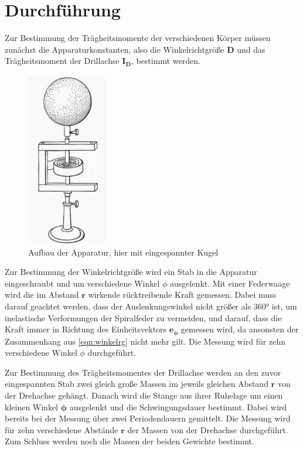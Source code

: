 \section{Durchführung}
\label{sec:Durchführung}

Zur Bestimmung der Trägheitsmomente der verschiedenen Körper müssen zunächst die
Apparaturkonstanten, also die Winkelrichtgröße $\symbf{D}$ und das Trägheitsmoment
der Drillachse $\symbf{I_D}$, bestimmt werden.
\begin{figure}
  \centering
  \includegraphics[width=100pt]{Aufbau.png}
  \caption{Aufbau der Apparatur, hier mit eingespannter Kugel \cite{Versuchsanleitung}}
  \label{fig:Aufbau}
\end{figure}


Zur Bestimmung der Winkelrichtgröße wird ein Stab in die Apparatur eingeschraubt und
um verschiedene Winkel $\phi$ ausgelenkt. Mit einer Federwaage wird die im Abstand
$\symbf{r}$ wirkende rücktreibende Kraft gemessen. Dabei muss darauf geachtet werden,
dass der Auslenkungswinkel nicht größer als 360° ist, um inelastische Verformungen der
Spiralfeder zu vermeiden, und darauf, dass die Kraft immer in Richtung des Einheitsvektors
$\symbf{e_{\phi}}$ gemessen wird, da ansonsten der Zusammenhang aus \eqref{eqn:winkelrg}
nicht mehr gilt. Die Messung wird für zehn verschiedene Winkel $\phi$ durchgeführt.

Zur Bestimmung des Trägheitsmomentes der Drillachse werden an den zuvor eingespannten
Stab zwei gleich große Massen im jeweils gleichen Abstand $\symbf{r}$ von der
Drehachse gehängt. Danach wird die Stange aus ihrer Ruhelage um einen kleinen Winkel
$\symbf{\phi}$ ausgelenkt und die Schwingungsdauer bestimmt. Dabei wird bereits bei
der Messung über zwei Periodendauern gemittelt. Die Messung wird für zehn verschiedene
Abstände $\symbf{r}$ der Massen von der Drehachse durchgeführt. Zum Schluss werden
noch die Massen der beiden Gewichte bestimmt.

